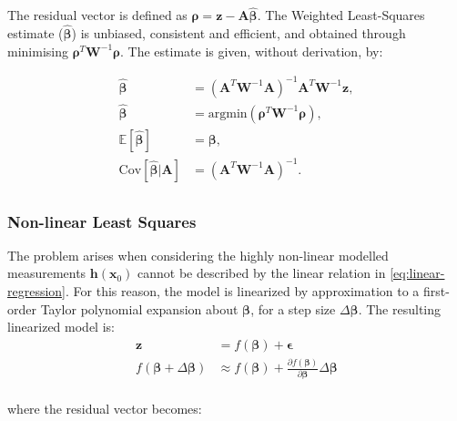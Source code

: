 The residual vector is defined as $\bm{\rho}=\bm{z}-\bm{A}\hat{\bm{\beta}}$. The
Weighted Least-Squares estimate ($\bm{\hat{\beta}}$) is unbiased, consistent and
efficient, and obtained through minimising $\bm{\rho}^T\bm{W}^{-1}\bm{\rho}$.
The estimate is given, without derivation, by:


\begin{equation}
    \begin{aligned}
        \bm{\hat{\beta}} &= (\bm{A}^T\bm{W}^{-1}\bm{A})^{-1}\bm{A}^T\bm{W}^{-1}\bm{z}, \\
        \bm{\hat{\beta}} &= \text{argmin}(\bm{\rho}^T\bm{W}^{-1}\bm{\rho}), \\
        \mathbb{E}[\bm{\hat{\beta}}] &= \bm{\beta}, \\
        \text{Cov}[\bm{\hat{\beta}}|\bm{A}] &= (\bm{A}^T\bm{W}^{-1}\bm{A})^{-1}. \\
    \end{aligned}
\end{equation}

\subsubsection{Non-linear Least Squares}

The problem arises when considering the highly non-linear modelled measurements
$\bm{h}(\bm{x}_0)$ cannot be described by the linear relation in
\autoref{eq:linear-regression}. For this reason, the model is linearized by
approximation to a first-order Taylor polynomial expansion about $\bm{\beta}$,
for a step size $\Delta\bm{\beta}$. The resulting linearized model is:
\begin{equation}
    \begin{aligned}
        \bm{z}                              &=        f(\bm{\beta}) + \bm{\epsilon}                                                              \\
        f(\bm{\beta}+\Delta\bm{\beta}) &\approx  f(\bm{\beta}) + \frac{\partial{f(\bm{\beta})}}{\partial{\bm{\beta}}}\Delta\bm{\beta}  \\
    \end{aligned}
\end{equation}

where the residual vector becomes:

